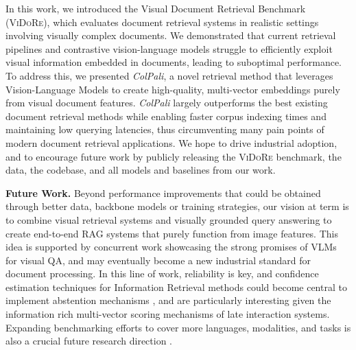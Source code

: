 In this work, we introduced the Visual Document Retrieval Benchmark (\textsc{ViDoRe}), which evaluates document retrieval systems in realistic settings involving visually complex documents. We demonstrated that current retrieval pipelines and contrastive vision-language models struggle to efficiently exploit visual information embedded in documents, leading to suboptimal performance. To address this, we presented \textit{ColPali}, a novel retrieval method that leverages Vision-Language Models to create high-quality, multi-vector embeddings purely from visual document features. \textit{ColPali} largely outperforms the best existing document retrieval methods while enabling faster corpus indexing times and maintaining low querying latencies, thus circumventing many pain points of modern document retrieval applications. We hope to drive industrial adoption, and to encourage future work by publicly releasing the \textsc{ViDoRe} benchmark, the data, the codebase, and all models and baselines from our work.


\noindent\textbf{Future Work.} 
Beyond performance improvements that could be obtained through better data, backbone models or training strategies, our vision at term is to combine visual retrieval systems and visually grounded query answering to create end-to-end RAG systems that purely function from image features. This idea is supported by concurrent work  showcasing the strong promises of VLMs for visual QA, and may eventually become a new industrial standard for document processing. In this line of work, reliability is key, and confidence estimation techniques for Information Retrieval methods could become central to implement abstention mechanisms , and are particularly interesting given the information rich multi-vector scoring mechanisms of late interaction systems.
Expanding benchmarking efforts to cover more languages, modalities, and tasks is also a crucial future research direction .
 
